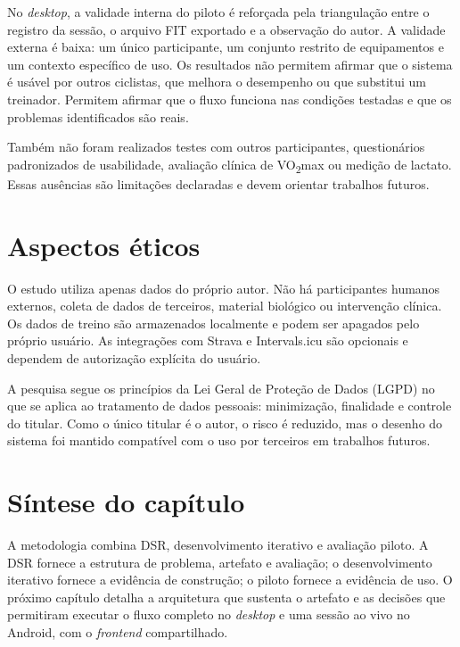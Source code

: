 No \textit{desktop}, a validade interna do piloto é reforçada pela triangulação
entre o registro da sessão, o arquivo FIT exportado e a observação do autor. A validade externa é
baixa: um único participante, um conjunto restrito de equipamentos e um
contexto específico de uso. Os resultados não permitem afirmar que o sistema é
usável por outros ciclistas, que melhora o desempenho ou que substitui um
treinador. Permitem afirmar que o fluxo funciona nas condições testadas e que
os problemas identificados são reais.

Também não foram realizados testes com outros participantes, questionários
padronizados de usabilidade, avaliação clínica de VO\textsubscript{2}max ou
medição de lactato. Essas ausências são limitações declaradas e devem orientar
trabalhos futuros.

\section{Aspectos éticos}
\label{sec:etica}

O estudo utiliza apenas dados do próprio autor. Não há participantes humanos
externos, coleta de dados de terceiros, material biológico ou intervenção
clínica. Os dados de treino são armazenados localmente e podem ser apagados pelo
próprio usuário. As integrações com Strava e Intervals.icu são opcionais e
dependem de autorização explícita do usuário.

A pesquisa segue os princípios da Lei Geral de Proteção de Dados (LGPD) no que
se aplica ao tratamento de dados pessoais: minimização, finalidade e controle
do titular. Como o único titular é o autor, o risco é reduzido, mas o desenho do
sistema foi mantido compatível com o uso por terceiros em trabalhos futuros.

\section{Síntese do capítulo}
\label{sec:sintese-metodologia}

A metodologia combina DSR, desenvolvimento iterativo e avaliação piloto. A DSR
fornece a estrutura de problema, artefato e avaliação; o desenvolvimento
iterativo fornece a evidência de construção; o piloto fornece a evidência de
uso. O próximo capítulo detalha a arquitetura que sustenta o artefato e as decisões
que permitiram executar o fluxo completo no \textit{desktop} e uma sessão ao
vivo no Android, com o \textit{frontend} compartilhado.

